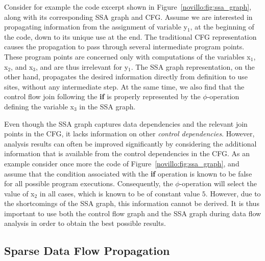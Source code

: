 Consider for example the code excerpt shown in
Figure~\ref{novillo:fig:ssa_graph}, along with its corresponding SSA graph and
CFG. Assume we are interested in propagating information from the assignment of
variable y$_1$, at the beginning of the code, down to its unique use at
the end. The traditional CFG representation causes the propagation
to pass through several intermediate program points. These program points are
concerned only with computations of the variables x$_1$, x$_2$, and x$_3$, and
are thus irrelevant for y$_1$. The SSA graph representation, on
the other hand, propagates the desired information directly from definition to
use sites, without
any intermediate step. At the same time, we also find that the control flow
join following the \textbf{if} is properly represented by the $\phi$-operation
defining the variable x$_3$ in the SSA graph.

Even though the SSA graph captures data dependencies and the relevant join
points in the CFG, it lacks information on other
\emph{control dependencies}. However, analysis results can often be improved
significantly by considering the additional information that is available from
the control dependencies in the CFG. As an example consider once more
the code of Figure~\ref{novillo:fig:ssa_graph}, and assume that the
condition associated with the \textbf{if} operation is known to be false for all
possible program executions. Consequently, the $\phi$-operation will select the
value of x$_2$ in all cases, which is known to be of constant value $5$.
However, due to the shortcomings of the SSA graph, this information cannot be
derived. It is thus important to use both the control flow graph and the SSA
graph during data flow analysis in order to obtain the best possible results.

\subsection{Sparse Data Flow Propagation}

